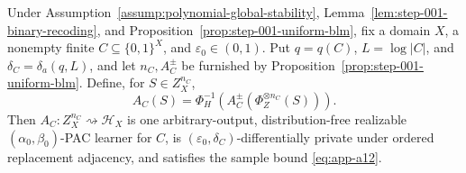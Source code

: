 \begin{proposition}
\label{prop:step-001-binary-private-learner}
Under Assumption~\ref{assump:polynomial-global-stability},
Lemma~\ref{lem:step-001-binary-recoding}, and
Proposition~\ref{prop:step-001-uniform-blm}, fix a domain \(X\), a
nonempty finite \(C\subseteq\{0,1\}^X\), and
\(\varepsilon_0\in(0,1)\).  Put \(q=q(C)\), \(L=\log|C|\), and
\(\delta_C=\delta_a(q,L)\), and let \(n_C,A_C^\pm\) be furnished by
Proposition~\ref{prop:step-001-uniform-blm}.  Define, for
\(S\in Z_X^{n_C}\),
\begin{equation}
A_C(S)=
\Phi_H^{-1}\!\left(
A_C^\pm(\Phi_Z^{\otimes n_C}(S))
\right).
\label{eq:app-a13}
\end{equation}
Then \(A_C:Z_X^{n_C}\rightsquigarrow\mathcal H_X\) is one
arbitrary-output, distribution-free realizable
\((\alpha_0,\beta_0)\)-PAC learner for \(C\), is
\((\varepsilon_0,\delta_C)\)-differentially private under ordered
replacement adjacency, and satisfies the sample bound \eqref{eq:app-a12}.
\end{proposition}

